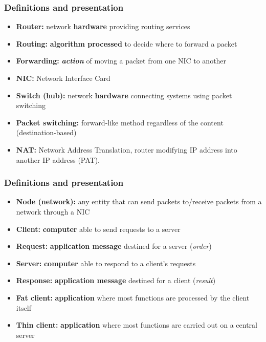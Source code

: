   \begin{frame}
    \frametitle{Definitions and presentation}
      \begin{itemize}
        \item \textbf{Router:} network \textbf{hardware} providing routing services
        \item \textbf{Routing:} \textbf{algorithm processed} to decide where to forward a packet
        \item \textbf{Forwarding:} \textbf{\emph{action}} of moving a packet from one NIC to another
        \item \textbf{NIC:} Network Interface Card
        \item \textbf{Switch (hub):} network \textbf{hardware} connecting systems using packet switching
        \item \textbf{Packet switching:} forward-like method regardless of the content (destination-based)
        \item \textbf{NAT:} Network Address Translation, router modifying IP address into another IP address (PAT).
      \end{itemize}
  \end{frame}
  \begin{frame}
    \frametitle{Definitions and presentation}
      \begin{itemize}
        \item \textbf{Node (network):} any entity that can send packets to/receive packets from a network through a NIC
        \item \textbf{Client:} \textbf{computer} able to send requests to a server
        \item \textbf{Request:} \textbf{application message} destined for a server (\emph{order})
        \item \textbf{Server:} \textbf{computer} able to respond to a client's requests
        \item \textbf{Response:} \textbf{application message} destined for a client (\emph{result})
        \item \textbf{Fat client:} \textbf{application} where most functions are processed by the client itself
        \item \textbf{Thin client:} \textbf{application} where most functions are carried out on a central server
      \end{itemize}
  \end{frame}

